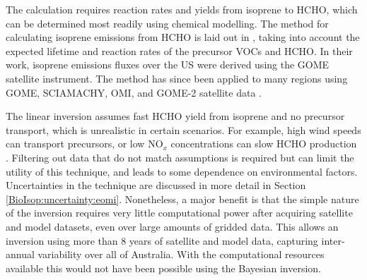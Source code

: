 \documentclass[acp, manuscript]{copernicus}
\newcommand{\parencite}{\citep}
\newcommand{\textcite}{\citet}
\begin{document}
The calculation requires reaction rates and yields from isoprene to HCHO, which can be determined most readily using chemical modelling.
The method for calculating isoprene emissions from HCHO is laid out in \textcite{Palmer2003}, taking into account the expected lifetime and reaction rates of the precursor VOCs and HCHO.
In their work, isoprene emissions fluxes over the US were derived using the GOME satellite instrument.
The method has since been applied to many regions using GOME, SCIAMACHY, OMI, and GOME-2 satellite data \parencite[e.g.,][]{Abbot2003, Barkley2013, Stavrakou2014, Surl2018}.



The linear inversion assumes fast HCHO yield from isoprene and no precursor transport, which is unrealistic in certain scenarios.
For example, high wind speeds can transport precursors, or low NO$_x$ concentrations can slow HCHO production \parencite{Palmer2006,Surl2018}.
Filtering out data that do not match assumptions is required but can limit the utility of this technique, and leads to some dependence on environmental factors.
Uncertainties in the technique are discussed in more detail in Section \ref{BioIsop:uncertainty:eomi}.
Nonetheless, a major benefit is that the simple nature of the inversion requires very little computational power after acquiring satellite and model datasets, even over large amounts of gridded data.
This allows an inversion using more than 8 years of satellite and model data, capturing inter-annual variability over all of Australia.
With the computational resources available this would not have been possible using the Bayesian inversion.
\end{document}

